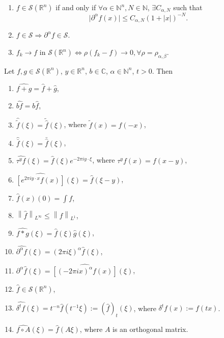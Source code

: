 \begin{remark}\label{rmk:schwarz_properties}
\begin{enumerate}[label=(\roman*)]
    \item $f \in \mathscr{S}(\mathbb{R}^{n})$ if and only if $\forall \alpha \in \mathbb{N}^{n}, N \in \mathbb{N}$, $\exists C_{\alpha,N}$ such that $$\lvert \partial ^{\alpha}f(x) \rvert \leq C_{\alpha,N}(1+\lvert x \rvert )^{-N}. $$
    \item $f \in \mathscr{S}\Rightarrow \partial ^{\alpha}f \in \mathscr{S}$.
    \item $f_{k}\to f$ in $\mathscr{S}(\mathbb{R}^{n})\Leftrightarrow \rho(f_{k}-f)\to 0, \forall \rho=\rho _{\alpha ,\beta}$.
\end{enumerate}
\end{remark}

\begin{theorem}\label{thm:1.1}
Let $f,g \in \mathscr{S}(\mathbb{R}^{n})$, $y \in \mathbb{R}^{n}$, $b \in \mathbb{C}$, $\alpha \in \mathbb{N}^{n}$, $t>0$. Then
\begin{enumerate}[label=(\roman*)]
    \item $\widehat{f+g}=\hat{f}+\hat{g}$,
    \item $\widehat{bf}=b \hat{f}$,
    \item $\hat{\tilde{f}}(\xi)=\tilde{\hat{f}}(\xi)$, where $\tilde{f}(x)=f(-x)$,
    \item $\hat{\bar{f}}(\xi)=\bar{\hat{f}}(\xi)$,
    \item $\widehat{\tau ^{y}f}(\xi)=\hat{f}(\xi)e^{-2\pi iy\cdot \xi}$, where $\tau ^{y}f(x)=f(x-y)$,
    \item $\widehat{[e^{2\pi iy\cdot x}f(x)]}(\xi)=\hat{f}(\xi-y)$,
    \item $\hat{f}(x)(0)=\int f$,
    \item $\left\| \hat{f} \right\|_{L^{\infty}}\leq \left\| f \right\|_{L^{1}}$,
    \item $\widehat{f*g}(\xi)=\hat{f}(\xi)\hat{g}(\xi)$,
    \item $\widehat{\partial ^{\alpha}f}(\xi)=(2\pi i\xi)^{\alpha}\hat{f}(\xi)$,
    \item $\partial ^{\alpha}\hat{f}(\xi)=\widehat{[(-2\pi ix)^{\alpha}f(x)]}(\xi)$,
    \item $\hat{f}\in \mathscr{S}(\mathbb{R}^{n})$,
    \item $\widehat{\delta ^{t}f}(\xi)=t^{-n}\hat{f}(t^{-1}\xi):=(\hat{f})_{t}(\xi)$, where $\delta ^{t}f(x):=f(tx)$.
    \item $\widehat{f\circ A}(\xi)=\hat{f}(A\xi)$, where $A$ is an orthogonal matrix.
\end{enumerate}
\end{theorem}

